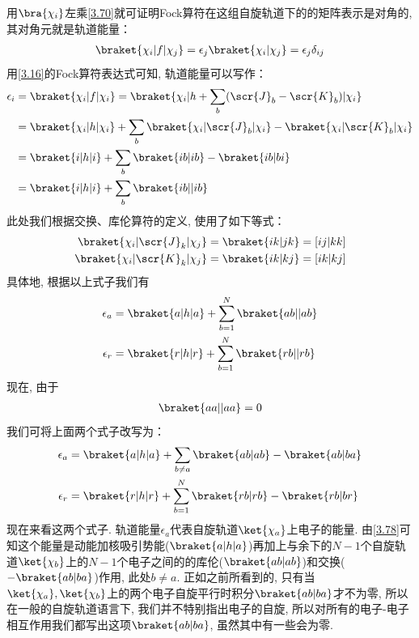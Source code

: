 用$\bra{\chi_i}$左乘\autoref{3.70}就可证明Fock算符在这组自旋轨道下的的矩阵表示是对角的, 
其对角元就是轨道能量：
\begin{align}
	\braket{\chi_i|f|\chi_j} = \epsilon_j\braket{\chi_i|\chi_j} = \epsilon_j\delta_{ij}
\end{align}
用\autoref{3.16}的Fock算符表达式可知, 
轨道能量可以写作：
\begin{align}
	\epsilon_i & = \braket{\chi_i|f|\chi_i} = \braket{\chi_i|h+\sum_b(\scr{J}_b-\scr{K}_b)|\chi_i}\notag\\
	& = \braket{\chi_i|h|\chi_i} + \sum_b\braket{\chi_i|\scr{J}_b|\chi_i} - \braket{\chi_i|\scr{K}_b|\chi_i}\notag\\
	& = \braket{i|h|i} + \sum_b\braket{ib|ib} - \braket{ib|bi}\notag\\
	& = \braket{i|h|i} + \sum_b\braket{ib||ib}
	\label{3.72}
\end{align}
此处我们根据交换、库伦算符的定义, 
使用了如下等式：
\begin{align}
	\braket{\chi_i|\scr{J}_k|\chi_j} & = \braket{ik|jk} = [ij|kk]\\
	\braket{\chi_i|\scr{K}_k|\chi_j} & = \braket{ik|kj} = [ik|kj]
\end{align}
具体地, 
根据以上式子我们有
\begin{align}
	\label{3.75}
	\epsilon_a & = \braket{a|h|a} + \sum_{b=1}^{N}\braket{ab||ab}\\
	\epsilon_r & = \braket{r|h|r} + \sum_{b=1}^{N}\braket{rb||rb}
	\label{3.76}
\end{align}
现在, 
由于
\begin{align}
	\braket{aa||aa} = 0
\end{align}
我们可将上面两个式子改写为：
\begin{align}
	\label{3.78}
	\epsilon_a & = \braket{a|h|a} + \sum_{b\neq a}\braket{ab|ab} - \braket{ab|ba}\\
	\epsilon_r & = \braket{r|h|r} + \sum_{b=1}^{N}\braket{rb|rb} - \braket{rb|br}
	\label{3.79}
\end{align}
现在来看这两个式子. 
轨道能量$\epsilon_a$代表自旋轨道$\ket{\chi_a}$上电子的能量. 
由\autoref{3.78}可知这个能量是动能加核吸引势能($\braket{a|h|a}$)再加上与余下的$N-1$个自旋轨道$\ket{\chi_b}$上的$N-1$个电子之间的的库伦($\braket{ab|ab}$)和交换($-\braket{ab|ba}$)作用, 
此处$b \neq a$. 
正如之前所看到的, 
只有当$\ket{\chi_a},\ket{\chi_b}$上的两个电子自旋平行时积分$\braket{ab|ba}$才不为零, 
所以在一般的自旋轨道语言下, 
我们并不特别指出电子的自旋, 
所以对所有的电子-电子相互作用我们都写出这项$\braket{ab|ba}$, 
虽然其中有一些会为零.


